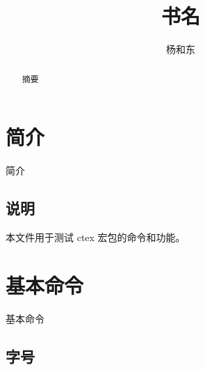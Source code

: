 \documentclass[cs4size,a4paper,fancyhdr,fntef,UTF8,adobefonts,hyperref]{ctexart}
\begin{document}
\title{书名}
\author{杨和东}
\maketitle
\listoftodos[待处理问题]
\begin{abstract}
	摘要
\end{abstract}
\section{简介} \label{chapter:intro}
简介
\subsection{说明}

本文件用于测试 ctex 宏包的命令和功能。

\section{基本命令}

基本命令


\subsection{字号}





\printindex
\end{document}
